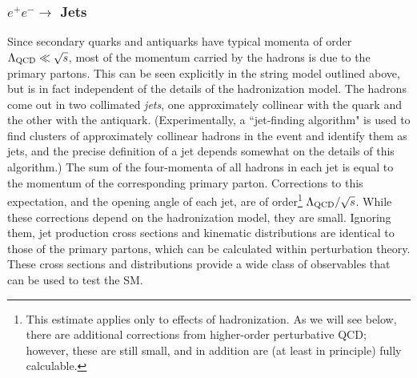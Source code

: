 \documentclass{ws-procs9x6}
\begin{document}
\subsubsection{$e^+e^-\to$ Jets}
\label{sec:jets}

Since secondary quarks and antiquarks have typical momenta of order $\Lambda_{\rm QCD}\ll \sqrt{s}$, most of the momentum carried by the hadrons is due to the primary partons. This can be seen explicitly in the string model outlined above, but is in fact independent of the details of the hadronization model. The hadrons come out in two collimated {\it jets}, one approximately collinear with the quark and the other with the antiquark. (Experimentally, a ``jet-finding algorithm" is used to find clusters of approximately collinear hadrons in the event and identify them as jets, and the precise definition of a jet depends somewhat on the details of this algorithm.) The sum of the four-momenta of all hadrons in each jet is equal to the momentum of the corresponding primary parton. Corrections to this expectation, and the opening angle of each jet, are of order\footnote{This estimate applies only to effects of hadronization. As we will see below, there are additional corrections from higher-order perturbative QCD; however, these are still small, and in addition are (at least in principle) fully calculable.} $\Lambda_{\rm QCD}/\sqrt{s}$. While these corrections depend on the hadronization model, they are small. Ignoring them, jet production cross sections and kinematic distributions are identical to those of the primary partons, which can be calculated within perturbation theory. These cross sections and distributions provide a wide class of observables that can be used to test the SM. 
\end{document}

